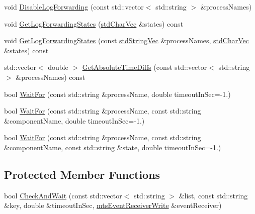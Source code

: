 \begin{DoxyCompactItemize}
\item 
void \hyperlink{classmts_manager_component_services_a4e336336253d0317957cbdc528788f85}{Disable\-Log\-Forwarding} (const std\-::vector$<$ std\-::string $>$ \&process\-Names)
\item 
void \hyperlink{classmts_manager_component_services_a6005565054c1a672521068c042b41e46}{Get\-Log\-Forwarding\-States} (\hyperlink{mts_generic_object_proxy_8h_a3fcb43cabc338a5aee6772138bee2416}{std\-Char\-Vec} \&states) const 
\item 
void \hyperlink{classmts_manager_component_services_a30d202afee529511340ee669a4f6c272}{Get\-Log\-Forwarding\-States} (const \hyperlink{mts_generic_object_proxy_8h_ae2238149254430b4959aa4e16892fc07}{std\-String\-Vec} \&process\-Names, \hyperlink{mts_generic_object_proxy_8h_a3fcb43cabc338a5aee6772138bee2416}{std\-Char\-Vec} \&states) const 
\item 
std\-::vector$<$ double $>$ \hyperlink{classmts_manager_component_services_ae94c0e549cbbfc1aae0317c852f7bb10}{Get\-Absolute\-Time\-Diffs} (const std\-::vector$<$ std\-::string $>$ \&process\-Names) const 
\item 
bool \hyperlink{classmts_manager_component_services_abeba632d29ddc21c78749bdc45ca77f0}{Wait\-For} (const std\-::string \&process\-Name, double timeout\-In\-Sec=-\/1.)
\item 
bool \hyperlink{classmts_manager_component_services_aeab518d92e65fa518daab70b6b0b2536}{Wait\-For} (const std\-::string \&process\-Name, const std\-::string \&component\-Name, double timeout\-In\-Sec=-\/1.)
\item 
bool \hyperlink{classmts_manager_component_services_a51f220f9475f7193ad1deb4ccfded73f}{Wait\-For} (const std\-::string \&process\-Name, const std\-::string \&component\-Name, const std\-::string \&state, double timeout\-In\-Sec=-\/1.)
\end{DoxyCompactItemize}

\subsection*{Protected Member Functions}
\begin{DoxyCompactItemize}
\item 
bool \hyperlink{classmts_manager_component_services_ad614ba5609bf014f5b0f26de272ff366}{Check\-And\-Wait} (const std\-::vector$<$ std\-::string $>$ \&list, const std\-::string \&key, double \&timeout\-In\-Sec, \hyperlink{classmts_event_receiver_write}{mts\-Event\-Receiver\-Write} \&event\-Receiver)
\end{DoxyCompactItemize}
